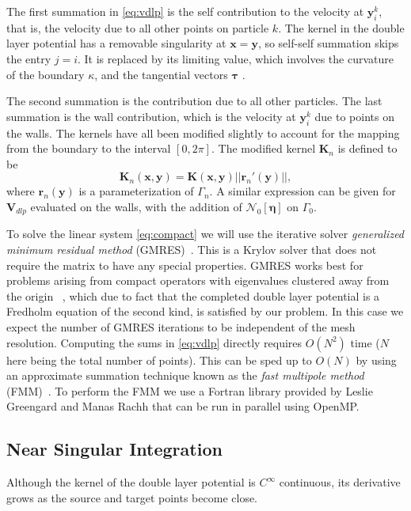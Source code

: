 The first summation in \eqref{eq:vdlp} is the self contribution to the velocity at $\mathbf{y}^k_i$, that is, the velocity due to all other points on particle $k$. The kernel in the double layer potential has a removable singularity at $\mathbf{x}=\mathbf{y}$, so self-self summation skips the entry $j=i$. It is replaced by its limiting value, which involves the curvature of the boundary $\kappa$, and the tangential vectors $\pmb{\tau}$ \cite{Ladyzhenskaya1963}. 

The second summation is the contribution due to all other particles. The last summation is the wall contribution, which is the velocity at $\mathbf{y}^k_i$ due to points on the walls. The kernels have all been modified slightly to account for the mapping from the boundary to the interval $[0,2\pi]$. The modified kernel $\mathbf{K}_n$ is defined to be
\[ \mathbf{K}_n(\mathbf{x},\mathbf{y}) = \mathbf{K}(\mathbf{x},\mathbf{y})||\mathbf{r}_n'(\mathbf{y})||,\]
where $\mathbf{r}_n(\mathbf{y})$ is a parameterization of $\Gamma_n$. A similar expression can be given for $\mathbf{V}_{dlp}$ evaluated on the walls, with the addition of $\mathcal{N}_0[\pmb{\eta}]$ on $\Gamma_0$. 

To solve the linear system \eqref{eq:compact} we will use the iterative solver \textit{generalized minimum residual method} (GMRES)~\cite{Saad1986}. This is a Krylov solver that does not require the matrix to have any special properties. GMRES works best for problems arising from compact operators with eigenvalues clustered away from the origin ~\cite{Rasmussen2001}, which due to fact that the completed double layer potential is a Fredholm equation of the second kind, is satisfied by our problem. In this case we expect the number of GMRES iterations to be independent of the mesh resolution. Computing the sums in \eqref{eq:vdlp} directly requires $O(N^2)$  time ($N$ here being the total number of points). This can be sped up to $O(N)$ by using an approximate summation technique known as the \textit{fast multipole method} (FMM)~\cite{Greengard1987, Nishimura2002}. To perform the FMM we use a Fortran library provided by Leslie Greengard and Manas Rachh that can be run in parallel using OpenMP. 


\subsection{Near Singular Integration}\label{sec:near_singular}



Although the kernel of the double layer potential is $C^{\infty}$ continuous, its derivative grows as the source and target points become close.

